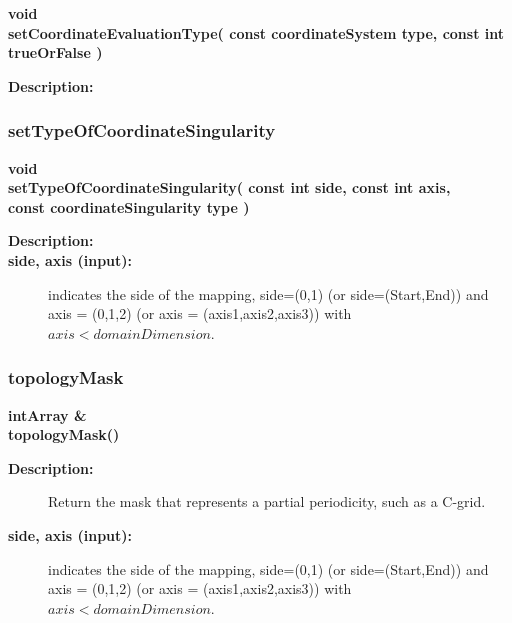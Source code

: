 \begin{flushleft} \textbf{%
void  \\ 
\settowidth{\MappingIncludeArgIndent}{setCoordinateEvaluationType(}%
setCoordinateEvaluationType( const coordinateSystem type, const int trueOrFalse )
}\end{flushleft}
\begin{description}
\item[{\bf Description:}] 
\end{description}
\subsubsection{setTypeOfCoordinateSingularity}
 
\begin{flushleft} \textbf{%
void  \\ 
\settowidth{\MappingIncludeArgIndent}{setTypeOfCoordinateSingularity(}%
setTypeOfCoordinateSingularity( const int side, const int axis, \\ 
\hspace{\MappingIncludeArgIndent}const coordinateSingularity type )
}\end{flushleft}
\begin{description}
\item[{\bf Description:}] 
\item[{\bf side, axis (input):}]  indicates the side of the mapping, side=(0,1) (or side=(Start,End)) 
     and axis = (0,1,2) (or axis = (axis1,axis2,axis3)) with $axis<domainDimension$.
\end{description}
\subsubsection{topologyMask}
 
\begin{flushleft} \textbf{%
intArray \&  \\ 
\settowidth{\MappingIncludeArgIndent}{topologyMask(}%
topologyMask()
}\end{flushleft}
\begin{description}
\item[{\bf Description:}] 
     Return the mask that represents a partial periodicity, such as a C-grid.
\item[{\bf side, axis (input):}]  indicates the side of the mapping, side=(0,1) (or side=(Start,End)) 
     and axis = (0,1,2) (or axis = (axis1,axis2,axis3)) with $axis<domainDimension$.
\end{description}
